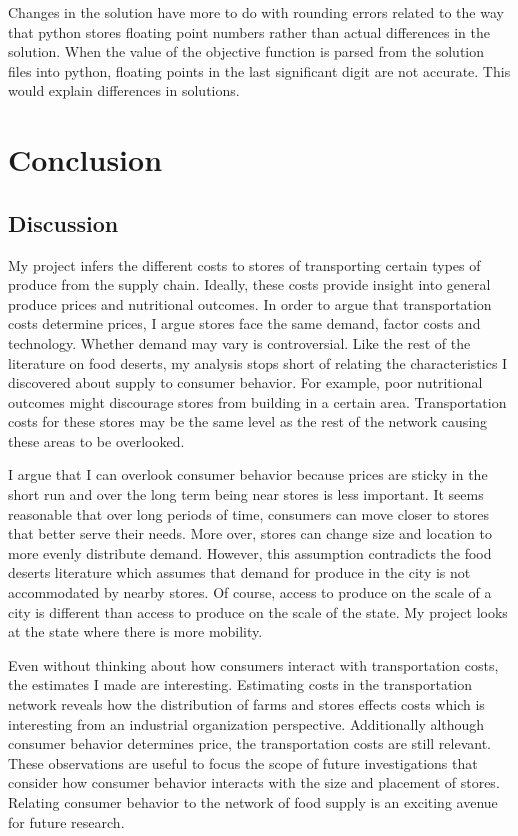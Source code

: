 \documentclass{report}
\begin{document}
Changes in the solution have more to do with rounding errors related to the way that python stores floating point numbers rather than actual differences in the solution. When the value of the objective function is parsed from the solution files into python, floating points in the last significant digit are not accurate. This would explain differences in solutions.

\chapter{Conclusion}

\section{Discussion}

My project infers the different costs to stores of transporting certain types of produce from the supply chain. Ideally, these costs provide insight into general produce prices and nutritional outcomes. In order to argue that transportation costs determine prices, I argue stores face the same demand, factor costs and technology. Whether demand may vary is controversial. Like the rest of the literature on food deserts, my analysis stops short of relating the characteristics I discovered about supply to consumer behavior. For example, poor nutritional outcomes might discourage stores from building in a certain area. Transportation costs for these stores may be the same level as the rest of the network causing these areas to be overlooked.

I argue that I can overlook consumer behavior because prices are sticky in the short run and over the long term being near stores is less important. It seems reasonable that over long periods of time, consumers can move closer to stores that better serve their needs. More over, stores can change size and location to more evenly distribute demand. However, this assumption contradicts the food deserts literature which assumes that demand for produce in the city is not accommodated by nearby stores. Of course, access to produce on the scale of a city is different than access to produce on the scale of the state. My project looks at the state where there is more mobility.

Even without thinking about how consumers interact with transportation costs, the estimates I made are interesting. Estimating costs in the transportation network reveals how the distribution of farms and stores effects costs which is interesting from an industrial organization perspective. Additionally although consumer behavior determines price, the transportation costs are still relevant. These observations are useful to focus the scope of future investigations that consider how consumer behavior interacts with the size and placement of stores.  Relating consumer behavior to the network of food supply is an exciting avenue for future research.
\end{document}
